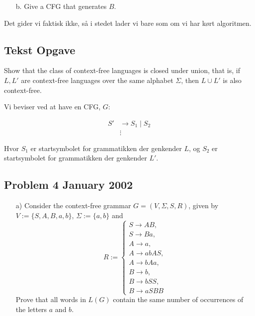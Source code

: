 \begin{enumerate}
  \item[b.] Give a CFG that generates $B$.
\end{enumerate}

Det gider vi faktisk ikke, så i stedet lader vi bare som om vi har kørt algoritmen.\\


\noindent
\subsection*{Tekst Opgave}
\noindent
Show that the class of context-free languages is closed under union, that is, if $L, L'$ are context-free languages over the same alphabet $\Sigma$, then $L \cup L'$ is also context-free.

Vi beviser ved at have en CFG, $G$:

\begin{equation*}
\begin{split}
  S' &\rightarrow S_{1} \; | \; S_{2}\\
 &\vdots
\end{split}
\end{equation*}

Hvor $S_{1}$ er startsymbolet for grammatikken der genkender $L$, og $S_{2}$ er startsymbolet for grammatikken der genkender $L'$.\\


\noindent
\subsection*{Problem 4 January 2002}
\noindent
\begin{enumerate}
    \item[a)] Consider the context-free grammar \( G = (V, \Sigma, S, R) \), given by
    \( V := \{S, A, B, a, b\} \), \( \Sigma := \{a, b\} \) and
    \[
    R := \left\{
    \begin{array}{l}
    S \to AB, \\
    S \to Ba, \\
    A \to a, \\
    A \to abAS, \\
    A \to bAa, \\
    B \to b, \\
    B \to bSS, \\
    B \to aSBB
    \end{array}
    \right.
    \]
    Prove that all words in \( L(G) \) contain the same number of occurrences of the letters \( a \) and \( b \).
\end{enumerate}

